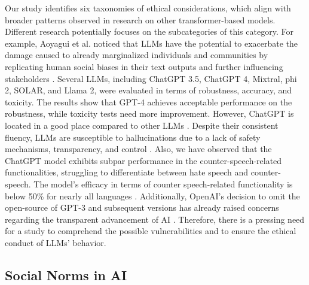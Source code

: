 \documentclass[sigconf]{acmart}
\begin{document}
Our study identifies six taxonomies of ethical considerations, which align with broader patterns observed in research on other transformer-based models. Different research potentially focuses on the subcategories of this category. For example, Aoyagui et al. noticed that LLMs have the potential to exacerbate the damage caused to already marginalized individuals and communities by replicating human social biases in their text outputs and further influencing stakeholders \cite{aoyagui2024exploring, liang2021towards}. Several LLMs, including ChatGPT 3.5, ChatGPT 4, Mixtral, phi 2, SOLAR, and Llama 2, were evaluated in terms of robustness, accuracy, and toxicity. The results show that GPT-4 achieves acceptable performance on the robustness, while toxicity tests need more improvement. However, ChatGPT is located in a good place compared to other LLMs \cite{cecchini2024holistic}. Despite their consistent fluency, LLMs are susceptible to hallucinations due to a lack of safety mechanisms, transparency, and control \cite{tanguy2016natural}. Also, we have observed that the ChatGPT model exhibits subpar performance in the counter-speech-related functionalities, struggling to differentiate between hate speech and counter-speech. The model's efficacy in terms of counter speech-related functionality is below 50\% for nearly all languages \cite{das2023evaluating}. Additionally, OpenAI's decision to omit the open-source of GPT-3 and subsequent versions has already raised concerns regarding the transparent advancement of AI \cite{huang2024survey}. Therefore, there is a pressing need for a study to comprehend the possible vulnerabilities and to ensure the ethical conduct of LLMs' behavior.






\subsection{Social Norms in AI}
\end{document}
